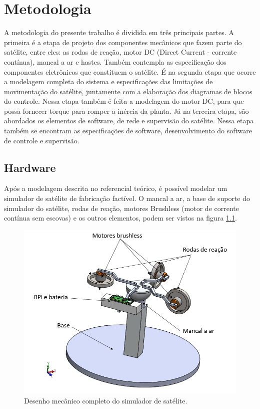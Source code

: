 \chapter{Metodologia}

A metodologia do presente trabalho é dividida em três principais partes. A primeira é a etapa de projeto dos componentes mecânicos que fazem parte do satélite, entre eles: as rodas de reação, motor DC (Direct Current - corrente contínua), mancal a ar e hastes. Também contempla as especificação dos componentes eletrônicos que constituem o satélite. É na segunda etapa que ocorre a modelagem completa do sistema e especificações das limitações de movimentação do satélite, juntamente com a elaboração dos diagramas de blocos do controle. Nessa etapa também é feita a modelagem do motor DC, para que possa fornecer torque para romper a inércia da planta. Já na terceira etapa, são abordados os elementos de software, de rede e supervisão do satélite. Nessa etapa também se encontram as especificações de software, desenvolvimento do software de controle e supervisão.



\section{Hardware}

Após a modelagem descrita no referencial teórico, é possível modelar um simulador de satélite de fabricação factível.  O mancal a ar, a base de suporte do simulador do satélite, rodas de reação, motores Brushless (motor de corrente contínua sem escovas) e os outros elementos, podem ser vistos na figura \ref{fig:satelite_completo}.

\begin{figure}[H]
  \caption{Desenho mecânico completo do simulador de satélite.}
  \begin{center}
      \includegraphics[scale=.5]{metodologia/img/satelite_completo}
  \end{center}
  \label{fig:satelite_completo}
\end{figure}

